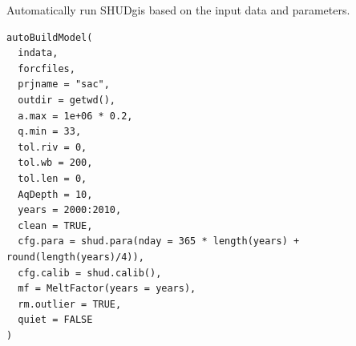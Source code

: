 \documentclass[a4paper]{book}
\begin{document}
%
\begin{Description}\relax
Automatically run SHUDgis based on the input data and parameters.
\end{Description}
%
\begin{Usage}
\begin{verbatim}
autoBuildModel(
  indata,
  forcfiles,
  prjname = "sac",
  outdir = getwd(),
  a.max = 1e+06 * 0.2,
  q.min = 33,
  tol.riv = 0,
  tol.wb = 200,
  tol.len = 0,
  AqDepth = 10,
  years = 2000:2010,
  clean = TRUE,
  cfg.para = shud.para(nday = 365 * length(years) + round(length(years)/4)),
  cfg.calib = shud.calib(),
  mf = MeltFactor(years = years),
  rm.outlier = TRUE,
  quiet = FALSE
)
\end{verbatim}
\end{Usage}
%
\end{document}
